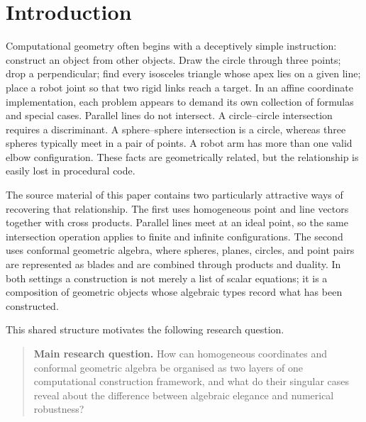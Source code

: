 \documentclass[11pt,a4paper]{article}
\theoremstyle{plain}
\theoremstyle{definition}
\theoremstyle{remark}
\begin{document}
\clearpage
{}
\setcounter{page}{1}

\section{Introduction}\label{sec:introduction}

Computational geometry often begins with a deceptively simple instruction:
construct an object from other objects. Draw the circle through three points;
drop a perpendicular; find every isosceles triangle whose apex lies on a given
line; place a robot joint so that two rigid links reach a target. In an affine
coordinate implementation, each problem appears to demand its own collection of
formulas and special cases. Parallel lines do not intersect. A circle--circle
intersection requires a discriminant. A sphere--sphere intersection is a circle,
whereas three spheres typically meet in a pair of points. A robot arm has more
than one valid elbow configuration. These facts are geometrically related, but
the relationship is easily lost in procedural code.

The source material of this paper contains two particularly attractive ways of
recovering that relationship. The first uses homogeneous point and line vectors
together with cross products. Parallel lines meet at an ideal point, so the same
intersection operation applies to finite and infinite configurations. The
second uses conformal geometric algebra, where spheres, planes, circles, and
point pairs are represented as blades and are combined through products and
duality. In both settings a construction is not merely a list of scalar
equations; it is a composition of geometric objects whose algebraic types
record what has been constructed.

This shared structure motivates the following research question.

\begin{quote}
\textbf{Main research question.} How can homogeneous coordinates and conformal
geometric algebra be organised as two layers of one computational construction
framework, and what do their singular cases reveal about the difference between
algebraic elegance and numerical robustness?
\end{quote}
\end{document}

